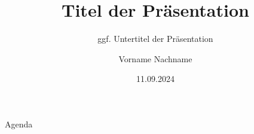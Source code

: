 \documentclass[
    usenames,
    dvipsnames,
    aspectratio=169
]{beamer}
\title[Kurztitel in der Fußnote]{Titel der Präsentation} %
\subtitle{ggf. Untertitel der Präsentation}
\author{Vorname Nachname}
\institute[]{
    Leibniz Universität Hannover \\
    Wirtschaftswissenschaftliche Fakultät \\
    Institut für Produktionswirtschaft
    }
\date{11.09.2024} %
\begin{document}
\begin{frame}
    \maketitle
\end{frame}

\begin{frame}{Agenda}
    \tableofcontents
\end{frame}













\end{document}
